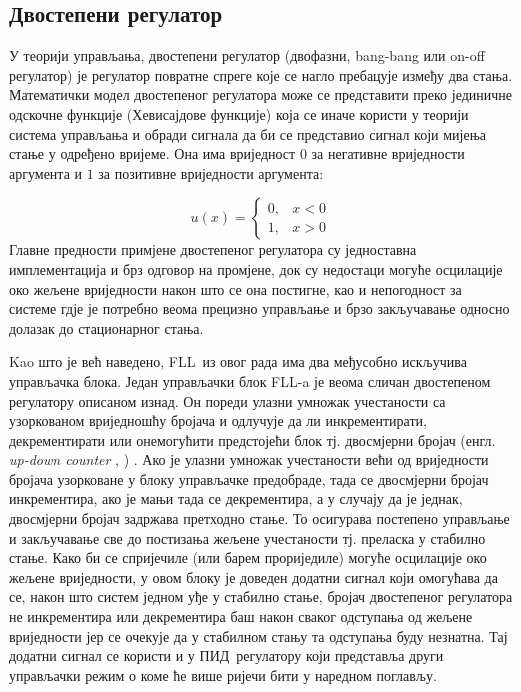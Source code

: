 \documentclass[master]{finthesis}
\makeatletter
\newcommand*{\engl}[2][\@empty]{%
    \edef\theacronym{#1}%
    (енгл. \foreignlanguage{english}{\emph{#2}%
    \ifx\theacronym\@empty \else , #1\fi})%
}
\def \FLL  {FLL} %
\def \PID  {ПИД} %
\makeatother
\begin{document}
\subsection{Двостепени регулатор} \label{section:bang_bang}
У теорији управљања, двостепени регулатор (двофазни, bang-bang или on-off регулатор) је регулатор повратне спреге које се нагло пребацује између два стања. Математички модел двостепеног регулатора може се представити преко јединичне одскочне функције (Хевисајдове функције) која се иначе користи у теорији система управљања и обради сигнала да би се представио сигнал који мијења стање у одређено вријеме. Она има вриједност $0$ за негативне вриједности аргумента и $1$ за позитивне вриједности аргумента:

\begin{equation}
	\label{eq_heaviside}
	u(x)= \begin{cases}
		0, & x < 0 \\
		1, & x > 0
		\end{cases}
\end{equation}
Главне предности примјене двостепеног регулатора су једноставна имплементација и брз одговор на промјене, док су недостаци могуће осцилације око жељене вриједности након што се она постигне, као и непогодност за системе гдје је потребно веома прецизно управљање и брзо закључавање односно долазак до стационарног стања. \par 
Kao што је већ наведено, \FLL\ из овог рада има два међусобно искључива управљачка блока. Један управљачки блок \FLL-a је веома сличан двостепеном регулатору описаном изнад. Он пореди улазни умножак учестаности са узоркованом вриједношћу бројача и одлучује да ли инкрементирати, декрементирати или онемогућити предстојећи блок тј. двосмјерни бројач \engl{up-down counter}. Ако је улазни умножак учестаности већи од вриједности бројача узорковане у блоку управљачке предобраде, тада се двосмјерни бројач инкрементира, ако је мањи тада се декрементира, а у случају да је једнак, двосмјерни бројач задржава претходно стање. То осигурава постепено управљање и закључавање све до постизања жељене учестаности тј. преласка у стабилно стање. Како би се спријечиле (или барем прориједиле) могуће осцилације око жељене вриједности, у овом блоку је доведен додатни сигнал који омогућава да се, након што систем једном уђе у стабилно стање, бројач двостепеног регулатора не инкрементира или декрементира баш након сваког одступања од жељене вриједности јер се очекује да у стабилном стању та одступања буду незнатна. Тај додатни сигнал се користи и у \PID\ регулатору који представља други управљачки режим о коме ће више ријечи бити у наредном поглављу.
\end{document}
